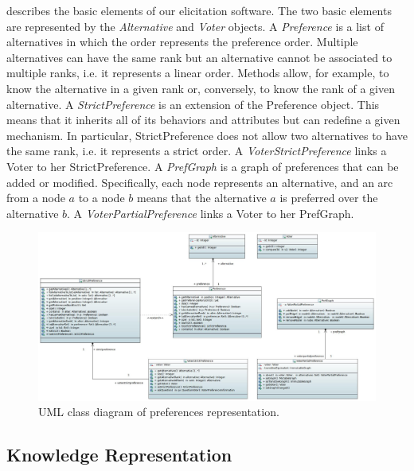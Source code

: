  describes the basic elements of our elicitation software.
The two basic elements are represented by the \textit{Alternative} and \textit{Voter} objects. A \textit{Preference} is a list of alternatives in which the order represents the preference order. Multiple alternatives can have the same rank but an alternative cannot be associated to multiple ranks, i.e. it represents a linear order. Methods allow, for example, to know the alternative in a given rank or, conversely, to know the rank of a given alternative.
A \textit{StrictPreference} is an extension of the Preference object. This means that it inherits all of its behaviors and attributes but can redefine a given mechanism. In particular, StrictPreference does not allow two alternatives to have the same rank, i.e. it represents a strict order.
A \textit{VoterStrictPreference} links a Voter to her StrictPreference.
A \textit{PrefGraph} is a graph of preferences that can be added or modified. Specifically, each node represents an alternative, and an arc from a node $a$ to a node $b$ means that the alternative $a$ is preferred over the alternative $b$.
A \textit{VoterPartialPreference} links a Voter to her PrefGraph.

\begin{figure}
	\centering
	\includegraphics[width=\textwidth]{uml/basic.jpeg}
	\caption{UML class diagram of preferences representation.}
	\label{uml:preference}
\end{figure}

\subsection{Knowledge Representation}


